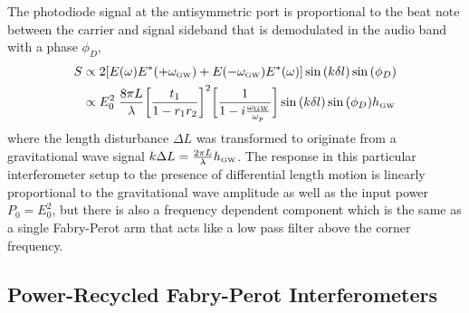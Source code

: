		The photodiode signal at the antisymmetric port is proportional to the beat note between the carrier and signal sideband that is demodulated in the audio band with a phase $\phi_{D}$,
		\begin{equation}
		\begin{aligned}
			S &\propto 2 [E(\omega) E^*(+\omega_{\text{\tiny GW}}) +  E(-\omega_{\text{\tiny GW}}) E^*(\omega) ] \sin{(k\delta l)} \sin{(\phi_{D})} \\
			  &\propto E_0^2 \; \frac{8\pi L}{\lambda}  \bigg[\frac{t_1}{1-r_1r_2}\bigg]^2 \bigg[\frac{1}{1 - i \frac{\omega_{\text{\tiny GW}}}{\omega_p}}\bigg] \sin{(k\delta l)} \sin{(\phi_{D})} h_{\text{\tiny GW}}
		\end{aligned}
		\end{equation}
		where the length disturbance $\Delta L$ was transformed to originate from a gravitational wave signal $k \Delta L = \frac{2\pi L}{\lambda} h_{\text{\tiny GW}}$.
		The response in this particular interferometer setup to the presence of differential length motion is linearly proportional to the gravitational wave amplitude as well as the input power $P_0 = E_0^2$, but there is also a frequency dependent component which is the same as a single Fabry-Perot arm that acts like a low pass filter above the corner frequency.

		\subsection{Power-Recycled Fabry-Perot Interferometers}
		
